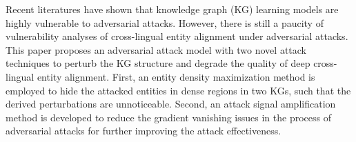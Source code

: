 Recent literatures have shown that knowledge graph (KG) learning models are highly vulnerable to adversarial attacks. However, there is still a paucity of vulnerability analyses of cross-lingual entity alignment under adversarial attacks. This paper proposes an adversarial attack model with two novel attack techniques to perturb the KG structure and degrade the quality of deep cross-lingual entity alignment. First, an entity density maximization method is employed to hide the attacked entities in dense regions in two KGs, such that the derived perturbations are unnoticeable. Second, an attack signal amplification method is developed to reduce the gradient vanishing issues in the process of adversarial attacks for further improving the attack effectiveness.
